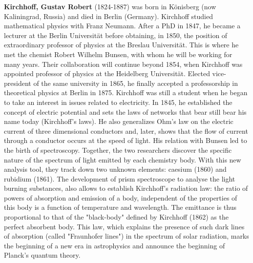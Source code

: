 \textbf{Kirchhoff, Gustav Robert} (1824-1887) was born in Könisberg (now Kaliningrad, Russia) and died in Berlin (Germany). Kirchhoff studied mathematical physics with Franz Neumann. After a PhD in 1847, he became a lecturer at the Berlin Universität  before obtaining, in 1850, the position of extraordinary professor of physics at the Breslau Universität. This is where he met the chemist Robert Wilhelm Bunsen, with whom he will be working for many years. Their collaboration will continue beyond 1854, when Kirchhoff was appointed professor of physics at the  Heidelberg Universität. Elected vice-president of the same university in 1865, he finally accepted a professorship in theoretical physics at Berlin in 1875. Kirchhoff was still a student when he began to take an interest in issues related to electricity. In 1845, he established the concept of electric potential and sets the laws of networks that bear still bear his name today (Kirchhoff's laws). He also generalizes Ohm's law on the electric current of three dimensional conductors and, later, shows that the flow of current through a conductor occurs at the speed of light. His relation with Bunsen led to the birth of spectroscopy. Together, the two researchers discover the specific nature of the spectrum of light emitted by each chemistry body. With this new analysis tool, they track down two unknown elements: caesium (1860) and rubidium (1861). The development of prism spectroscope to analyse the light burning substances, also allows to establish Kirchhoff's radiation law: the ratio of powers of absorption and emission of a body, independent of the properties of this body is a function of temperature and wavelength. The emittance is thus proportional to that of the "black-body" defined by Kirchhoff (1862) as the perfect absorbent body. This law, which explains the presence of such dark lines of absorption (called "Fraunhofer lines") in the spectrum of solar radiation, marks the beginning of a new era in astrophysics and announce the beginning of Planck's quantum theory.

